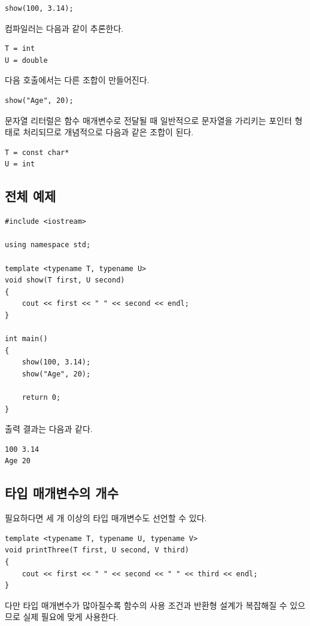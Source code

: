 \documentclass[11pt,a4paper]{article}
\begin{document}
\begin{lstlisting}
show(100, 3.14);
\end{lstlisting}

컴파일러는 다음과 같이 추론한다.

\begin{verbatim}
T = int
U = double
\end{verbatim}

다음 호출에서는 다른 조합이 만들어진다.

\begin{lstlisting}
show("Age", 20);
\end{lstlisting}

문자열 리터럴은 함수 매개변수로 전달될 때 일반적으로 문자열을 가리키는 포인터 형태로 처리되므로 개념적으로 다음과 같은 조합이 된다.

\begin{verbatim}
T = const char*
U = int
\end{verbatim}

\subsection{전체 예제}
\begin{lstlisting}
#include <iostream>

using namespace std;

template <typename T, typename U>
void show(T first, U second)
{
    cout << first << " " << second << endl;
}

int main()
{
    show(100, 3.14);
    show("Age", 20);

    return 0;
}
\end{lstlisting}

출력 결과는 다음과 같다.

\begin{verbatim}
100 3.14
Age 20
\end{verbatim}

\subsection{타입 매개변수의 개수}
필요하다면 세 개 이상의 타입 매개변수도 선언할 수 있다.

\begin{lstlisting}
template <typename T, typename U, typename V>
void printThree(T first, U second, V third)
{
    cout << first << " " << second << " " << third << endl;
}
\end{lstlisting}

다만 타입 매개변수가 많아질수록 함수의 사용 조건과 반환형 설계가 복잡해질 수 있으므로 실제 필요에 맞게 사용한다.
\end{document}
